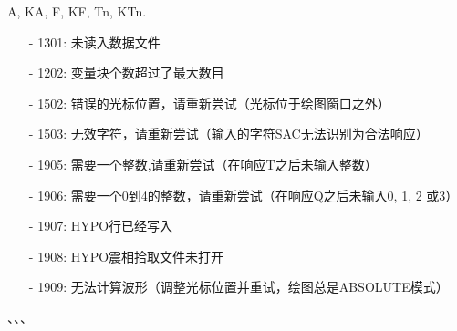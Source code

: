 A, KA, F, KF, Tn, KTn.

\begin{itemize}
\item[-]1301: 未读入数据文件
\item[-]1202: 变量块个数超过了最大数目
\end{itemize}

\begin{itemize}
\item[-]1502: 错误的光标位置，请重新尝试（光标位于绘图窗口之外）
\item[-]1503: 无效字符，请重新尝试（输入的字符SAC无法识别为合法响应）
\item[-]1905: 需要一个整数,请重新尝试（在响应T之后未输入整数）
\item[-]1906: 需要一个0到4的整数，请重新尝试（在响应Q之后未输入0, 1, 2 或3）
\item[-]1907: HYPO行已经写入
\item[-]1908: HYPO震相拾取文件未打开
\item[-] 1909: 无法计算波形（调整光标位置并重试，绘图总是ABSOLUTE模式）
\end{itemize}

、、、
